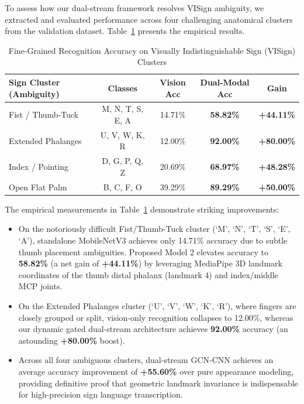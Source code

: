 \documentclass[journal]{IEEEtran}
\begin{document}
To assess how our dual-stream framework resolves VISign ambiguity, we extracted and evaluated performance across four challenging anatomical clusters from the validation dataset. Table~\ref{tab:visigns} presents the empirical results.

\begin{table}[t]
\centering
\caption{Fine-Grained Recognition Accuracy on Visually Indistinguishable Sign (VISign) Clusters}
\label{tab:visigns}
\begin{tabular}{lcccc}
\toprule
\textbf{Sign Cluster (Ambiguity)} & \textbf{Classes} & \textbf{Vision Acc} & \textbf{Dual-Modal Acc} & \textbf{Gain} \\
\midrule
Fist / Thumb-Tuck & M, N, T, S, E, A & 14.71\% & \textbf{58.82\%} & \textbf{+44.11\%} \\
Extended Phalanges & U, V, W, K, R    & 12.00\% & \textbf{92.00\%} & \textbf{+80.00\%} \\
Index / Pointing & D, G, P, Q, Z    & 20.69\% & \textbf{68.97\%} & \textbf{+48.28\%} \\
Open Flat Palm   & B, C, F, O       & 39.29\% & \textbf{89.29\%} & \textbf{+50.00\%} \\
\bottomrule
\end{tabular}
\end{table}

The empirical measurements in Table~\ref{tab:visigns} demonstrate striking improvements:
\begin{itemize}
    \item On the notoriously difficult Fist/Thumb-Tuck cluster (`M', `N', `T', `S', `E', `A'), standalone MobileNetV3 achieves only 14.71\% accuracy due to subtle thumb placement ambiguities. Proposed Model 2 elevates accuracy to \textbf{58.82\%} (a net gain of \textbf{+44.11\%}) by leveraging MediaPipe 3D landmark coordinates of the thumb distal phalanx (landmark 4) and index/middle MCP joints.
    \item On the Extended Phalanges cluster (`U', `V', `W', `K', `R'), where fingers are closely grouped or split, vision-only recognition collapses to 12.00\%, whereas our dynamic gated dual-stream architecture achieves \textbf{92.00\%} accuracy (an astounding \textbf{+80.00\%} boost).
    \item Across all four ambiguous clusters, dual-stream GCN-CNN achieves an average accuracy improvement of \textbf{+55.60\%} over pure appearance modeling, providing definitive proof that geometric landmark invariance is indispensable for high-precision sign language transcription.
\end{itemize}
\end{document}

